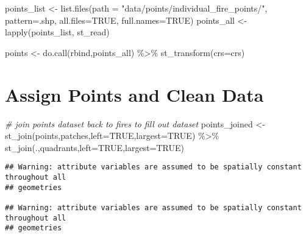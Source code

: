 \documentclass[
]{book}
\newenvironment{Shaded}{\begin{snugshade}}{\end{snugshade}}
\newcommand{\AttributeTok}[1]{\textcolor[rgb]{0.77,0.63,0.00}{#1}}
\newcommand{\CommentTok}[1]{\textcolor[rgb]{0.56,0.35,0.01}{\textit{#1}}}
\newcommand{\ConstantTok}[1]{\textcolor[rgb]{0.00,0.00,0.00}{#1}}
\newcommand{\FunctionTok}[1]{\textcolor[rgb]{0.00,0.00,0.00}{#1}}
\newcommand{\NormalTok}[1]{#1}
\newcommand{\OtherTok}[1]{\textcolor[rgb]{0.56,0.35,0.01}{#1}}
\newcommand{\SpecialCharTok}[1]{\textcolor[rgb]{0.00,0.00,0.00}{#1}}
\newcommand{\StringTok}[1]{\textcolor[rgb]{0.31,0.60,0.02}{#1}}
\begin{document}
\begin{Shaded}
\begin{Highlighting}[]
\NormalTok{points\_list }\OtherTok{\textless{}{-}} \FunctionTok{list.files}\NormalTok{(}\AttributeTok{path =} \StringTok{"data/points/individual\_fire\_points/"}\NormalTok{, }\AttributeTok{pattern=}\StringTok{\textquotesingle{}.shp\textquotesingle{}}\NormalTok{, }\AttributeTok{all.files=}\ConstantTok{TRUE}\NormalTok{, }\AttributeTok{full.names=}\ConstantTok{TRUE}\NormalTok{)}
\NormalTok{points\_all }\OtherTok{\textless{}{-}} \FunctionTok{lapply}\NormalTok{(points\_list, st\_read)}

\NormalTok{points }\OtherTok{\textless{}{-}} \FunctionTok{do.call}\NormalTok{(rbind,points\_all) }\SpecialCharTok{\%\textgreater{}\%} 
  \FunctionTok{st\_transform}\NormalTok{(}\AttributeTok{crs=}\NormalTok{crs)}
\end{Highlighting}
\end{Shaded}

\hypertarget{assign-points-and-clean-data}{%
\section{Assign Points and Clean Data}\label{assign-points-and-clean-data}}

\begin{Shaded}
\begin{Highlighting}[]
\CommentTok{\# join points dataset back to fires to fill out dataset}
\NormalTok{points\_joined }\OtherTok{\textless{}{-}} \FunctionTok{st\_join}\NormalTok{(points,patches,}\AttributeTok{left=}\ConstantTok{TRUE}\NormalTok{,}\AttributeTok{largest=}\ConstantTok{TRUE}\NormalTok{) }\SpecialCharTok{\%\textgreater{}\%} 
  \FunctionTok{st\_join}\NormalTok{(.,quadrants,}\AttributeTok{left=}\ConstantTok{TRUE}\NormalTok{,}\AttributeTok{largest=}\ConstantTok{TRUE}\NormalTok{)}
\end{Highlighting}
\end{Shaded}

\begin{verbatim}
## Warning: attribute variables are assumed to be spatially constant throughout all
## geometries

## Warning: attribute variables are assumed to be spatially constant throughout all
## geometries
\end{verbatim}
\end{document}
